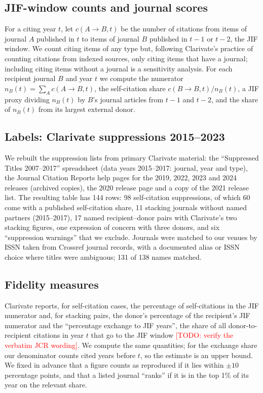 \documentclass[11pt]{article}
\newcommand{\todo}[1]{\textcolor{red}{[TODO: #1]}}
\begin{document}
\subsection{JIF-window counts and journal scores}
For a citing year $t$, let $c(A\!\to\!B,t)$ be the number of citations from items of journal $A$ published in $t$ to
items of journal $B$ published in $t-1$ or $t-2$, the JIF window. We count citing items of any type but, following
Clarivate's practice of counting citations from indexed sources, only citing items that have a journal; including
citing items without a journal is a sensitivity analysis. For each recipient journal $B$ and year $t$ we compute the
numerator $n_B(t)=\sum_A c(A\!\to\!B,t)$, the self-citation share $c(B\!\to\!B,t)/n_B(t)$, a JIF proxy dividing $n_B(t)$
by $B$'s journal articles from $t-1$ and $t-2$, and the share of $n_B(t)$ from its largest external donor.

\subsection{Labels: Clarivate suppressions 2015--2023}
We rebuilt the suppression lists from primary Clarivate material: the ``Suppressed Titles 2007--2017'' spreadsheet
(data years 2015--2017: journal, year and type), the Journal Citation Reports help pages for the 2019, 2022, 2023 and
2024 releases (archived copies), the 2020 release page and a copy of the 2021 release list. The resulting table has 144
rows: 98 self-citation suppressions, of which 60 come with a published self-citation share, 11 stacking journals
without named partners (2015--2017), 17 named recipient--donor pairs with Clarivate's two stacking figures, one
expression of concern with three donors, and six ``suppression warnings'' that we exclude. Journals were matched to
our venues by ISSN taken from Crossref journal records, with a documented alias or ISSN choice where titles were
ambiguous; 131 of 138 names matched.

\subsection{Fidelity measures}
Clarivate reports, for self-citation cases, the percentage of self-citations in the JIF numerator and, for stacking
pairs, the donor's percentage of the recipient's JIF numerator and the ``percentage exchange to JIF years'', the share
of all donor-to-recipient citations in year $t$ that go to the JIF window \todo{verify the verbatim JCR wording}. We
compute the same quantities; for the exchange share our denominator counts cited years before $t$, so the estimate is
an upper bound. We fixed in advance that a figure counts as reproduced if it lies within $\pm10$ percentage points,
and that a listed journal ``ranks'' if it is in the top 1\% of its year on the relevant share.
\end{document}
